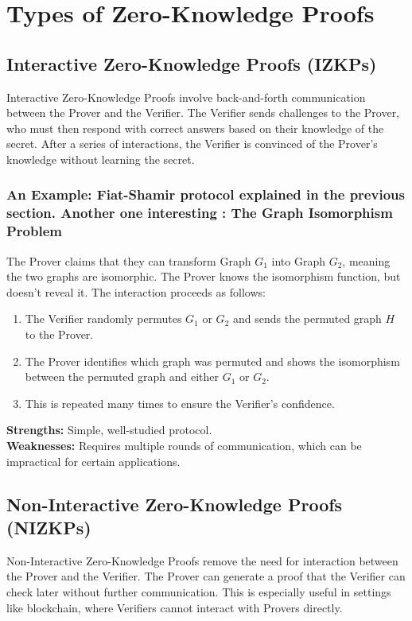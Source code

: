 \section{Types of Zero-Knowledge Proofs}

\subsection{Interactive Zero-Knowledge Proofs (IZKPs)}
Interactive Zero-Knowledge Proofs involve back-and-forth communication between the Prover and the Verifier. The Verifier sends challenges to the Prover, who must then respond with correct answers based on their knowledge of the secret. After a series of interactions, the Verifier is convinced of the Prover's knowledge without learning the secret.

\subsubsection{An Example: Fiat-Shamir protocol explained in the previous section. Another one interesting : The Graph Isomorphism Problem}
The Prover claims that they can transform Graph \( G_1 \) into Graph \( G_2 \), meaning the two graphs are isomorphic. The Prover knows the isomorphism function, but doesn’t reveal it. The interaction proceeds as follows:
\begin{enumerate}
    \item The Verifier randomly permutes \( G_1 \) or \( G_2 \) and sends the permuted graph \( H \) to the Prover.
    \item The Prover identifies which graph was permuted and shows the isomorphism between the permuted graph and either \( G_1 \) or \( G_2 \).
    \item This is repeated many times to ensure the Verifier’s confidence.
\end{enumerate}

\justify
\textbf{Strengths:} Simple, well-studied protocol.\\
\textbf{Weaknesses:} Requires multiple rounds of communication, which can be impractical for certain applications.

\subsection{Non-Interactive Zero-Knowledge Proofs (NIZKPs)}
Non-Interactive Zero-Knowledge Proofs remove the need for interaction between the Prover and the Verifier. The Prover can generate a proof that the Verifier can check later without further communication. This is especially useful in settings like blockchain, where Verifiers cannot interact with Provers directly.

